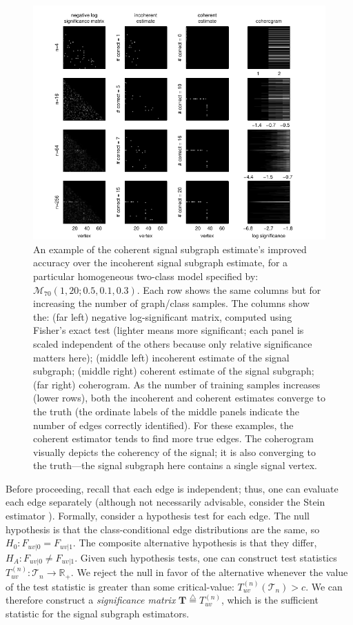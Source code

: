 \documentclass[10pt,journal,cspaper,compsoc]{IEEEtran}
\providecommand{\mc}[1]{\mathcal{#1}}
\providecommand{\mb}[1]{\boldsymbol{#1}}
\newcommand{\Real}{\mathbb{R}}
\newcommand{\defeq}{\overset{\triangle}{=}}
\begin{document}
\begin{figure}[tb!]
	\centering
		\includegraphics[width=1.0\linewidth]{../figs/demo_4x4_homo_V70_s20_p10_q30.pdf}
	\caption{An example of the coherent signal subgraph estimate's improved accuracy over the incoherent signal subgraph estimate, for a particular homogeneous two-class model specified by: $\mc{M}_{70}(1,20;0.5,0.1,0.3)$. Each row shows the same columns but for increasing the number of graph/class samples.  The columns show the: (far left) negative log-significant matrix, computed using Fisher's exact test (lighter means more significant; each panel is scaled independent of the others because only relative significance matters here); (middle left) incoherent estimate of the signal subgraph; (middle right) coherent estimate of the signal subgraph; (far right) coherogram.  As the number of training samples increases (lower rows), both the incoherent and coherent estimates converge to the truth (the ordinate labels of the middle panels indicate the number of edges correctly identified).  For these examples, the coherent estimator tends to find more true edges.  The coherogram visually depicts the coherency of the signal; it is also converging to the truth---the signal subgraph here contains a single signal vertex.}
	\label{fig:4x4}
\end{figure}



Before proceeding, recall that each edge is independent; thus, one can evaluate each edge separately (although not necessarily advisable, consider the Stein estimator \cite{Stein1956}).  Formally, consider a hypothesis test for each edge.  The null hypothesis is that the class-conditional edge distributions are the same, so $H_0: F_{uv|0}=F_{uv|1}$.  The composite alternative hypothesis is that they differ, $H_A: F_{uv|0} \neq F_{uv|1}$.  Given such hypothesis tests, one can construct test statistics $T_{uv}^{(n)}: \mc{T}_n \to \Real_+$.  We reject the null in favor of the alternative whenever the value of the test statistic is greater than some critical-value: $T_{uv}^{(n)}(\mc{T}_n)>c$.  We can therefore construct a \emph{significance matrix} $\mb{T} \defeq T_{uv}^{(n)}$, which is the sufficient statistic for the signal subgraph estimators. %
\end{document}
